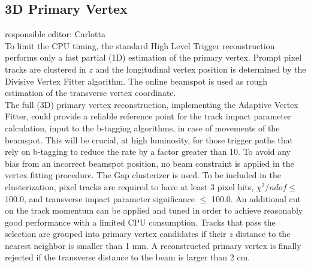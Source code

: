 \subsection{3D Primary Vertex}
responsible editor: Carlotta\\
To limit the CPU timing, the standard High Level Trigger reconstruction performs only a fast partial (1D) estimation of the primary vertex. Prompt pixel tracks are clustered in $z$ and the longitudinal vertex position is determined by the Divisive Vertex Fitter algorithm. The online beamspot is used as rough estimation of the transverse vertex coordinate.\\
The full (3D) primary vertex reconstruction, implementing the Adaptive Vertex Fitter, could provide a reliable reference point for the track impact parameter calculation, input to the b-tagging algorithms, in case of movements of the beamspot. This will be crucial, at  high luminosity, for those trigger paths that rely on b-tagging to reduce the rate by a factor greater than 10. To avoid any bias from an incorrect beamspot position, no beam constraint is applied in the vertex fitting procedure.
The Gap clusterizer is used.
To be included in the clusterization, pixel tracks are required to have at least 3 pixel hits, $\chi^{2}/ndof \leq$ 100.0, and transverse impact parameter significance $\leq$ 100.0.
An additional cut on the track momentum can be applied and tuned in order to achieve reasonably good performance with a limited CPU consumption. Tracks that pass the selection are grouped into primary vertex candidates if their $z$ distance to the nearest neighbor is smaller than 1 mm. A reconstructed primary vertex is finally rejected if the transverse distance to the beam is larger than 2 cm. 

